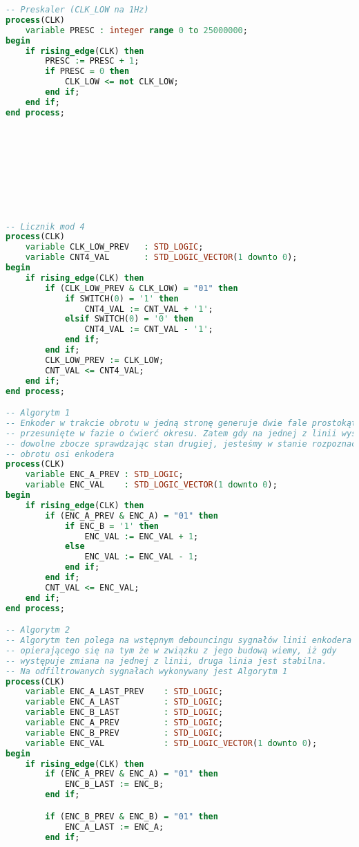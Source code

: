 \documentclass[12pt]{article}
\begin{document}
\begin{lstlisting}[language=VHDL, style=mystyle]
-- Preskaler (CLK_LOW na 1Hz)
process(CLK)
    variable PRESC : integer range 0 to 25000000;
begin
    if rising_edge(CLK) then
        PRESC := PRESC + 1;
        if PRESC = 0 then
            CLK_LOW <= not CLK_LOW;
        end if;
    end if;
end process;









-- Licznik mod 4
process(CLK)
    variable CLK_LOW_PREV   : STD_LOGIC;
    variable CNT4_VAL       : STD_LOGIC_VECTOR(1 downto 0);
begin
    if rising_edge(CLK) then
        if (CLK_LOW_PREV & CLK_LOW) = "01" then
            if SWITCH(0) = '1' then
                CNT4_VAL := CNT_VAL + '1';
            elsif SWITCH(0) = '0' then
                CNT4_VAL := CNT_VAL - '1';
            end if;
        end if;
        CLK_LOW_PREV := CLK_LOW;
        CNT_VAL <= CNT4_VAL;
    end if;
end process;

-- Algorytm 1
-- Enkoder w trakcie obrotu w jedną stronę generuje dwie fale prostokątne
-- przesunięte w fazie o ćwierć okresu. Zatem gdy na jednej z linii występuje
-- dowolne zbocze sprawdzając stan drugiej, jesteśmy w stanie rozpoznać kierunek
-- obrotu osi enkodera
process(CLK)
    variable ENC_A_PREV : STD_LOGIC;
    variable ENC_VAL    : STD_LOGIC_VECTOR(1 downto 0);
begin
    if rising_edge(CLK) then
        if (ENC_A_PREV & ENC_A) = "01" then
            if ENC_B = '1' then
                ENC_VAL := ENC_VAL + 1;
            else
                ENC_VAL := ENC_VAL - 1;
            end if;
        end if;
        CNT_VAL <= ENC_VAL;
    end if;
end process;

-- Algorytm 2
-- Algorytm ten polega na wstępnym debouncingu sygnałów linii enkodera
-- opierającego się na tym że w związku z jego budową wiemy, iż gdy
-- występuje zmiana na jednej z linii, druga linia jest stabilna.
-- Na odfiltrowanych sygnałach wykonywany jest Algorytm 1
process(CLK)
    variable ENC_A_LAST_PREV    : STD_LOGIC;
    variable ENC_A_LAST         : STD_LOGIC;
    variable ENC_B_LAST         : STD_LOGIC;
    variable ENC_A_PREV         : STD_LOGIC;
    variable ENC_B_PREV         : STD_LOGIC;
    variable ENC_VAL            : STD_LOGIC_VECTOR(1 downto 0);
begin
    if rising_edge(CLK) then
        if (ENC_A_PREV & ENC_A) = "01" then
            ENC_B_LAST := ENC_B;
        end if;

        if (ENC_B_PREV & ENC_B) = "01" then
            ENC_A_LAST := ENC_A;
        end if;


\end{lstlisting}
\end{document}
